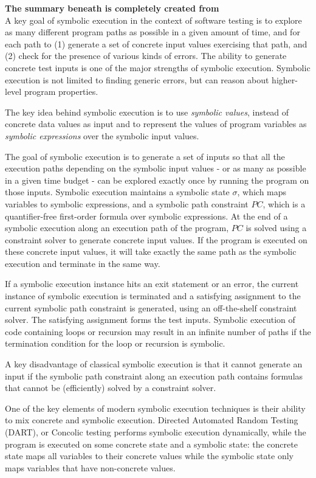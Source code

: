 \textbf{The summary beneath is completely created from \cite{cadar2013symbolic}}
\\

A key goal of symbolic execution in the context of software testing is to explore as many different program paths as possible in a given amount of time, and for each path to (1) generate a set of concrete input values exercising that path, and (2) check for the presence of various kinds of errors. The ability to generate concrete test inputs is one of the major strengths of symbolic execution.
Symbolic execution is not limited to finding generic errors, but can reason about higher-level program properties.

The key idea behind symbolic execution is to use \textit{symbolic values}, instead of concrete data values as input and to represent the values of program variables as \textit{symbolic expressions} over the symbolic input values.

The goal of symbolic execution is to generate a set of inputs so that all the execution paths depending on the symbolic input values - or as many as possible in a given time budget - can be explored exactly once by running the program on those inputs.
Symbolic execution maintains a symbolic state $\sigma$, which maps variables to symbolic expressions, and a symbolic path constraint $PC$, which is a quantifier-free first-order formula over symbolic expressions.
At the end of a symbolic execution along an execution path of the program, $PC$ is solved using a constraint solver to generate concrete input values. If the program is executed on these concrete input values, it will take exactly the same path as the symbolic execution and terminate in the same way.

If a symbolic execution instance hits an exit statement or an error, the current instance of symbolic execution is terminated and a satisfying assignment to the current symbolic path constraint is generated, using an off-the-shelf constraint solver. The satisfying assignment forms the test inputs.
Symbolic execution of code containing loops or recursion may result in an infinite number of paths if the termination condition for the loop or recursion is symbolic.

A key disadvantage of classical symbolic execution is that it cannot generate an input if the symbolic path constraint along an execution path contains formulas that cannot be (efficiently) solved by a constraint solver.

One of the key elements of modern symbolic execution techniques is their ability to mix concrete and symbolic execution.
Directed Automated Random Testing (DART), or Concolic testing performs symbolic execution dynamically, while the program is executed on some concrete state and a symbolic state: the concrete state maps all variables to their concrete values while the symbolic state only maps variables that have non-concrete values.

